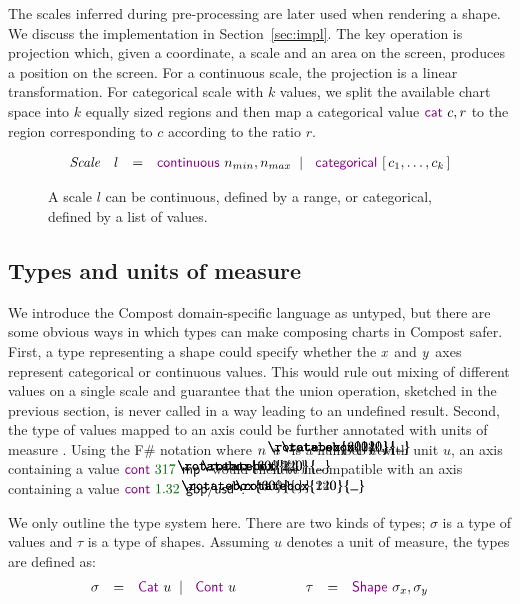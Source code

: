 \documentclass{jfp}
\newcommand{\X}{\emph{x}\ }
\newcommand{\Y}{\emph{y}\ }
\newcommand{\lsep}{\;\;|\;\;}
\newcommand{\num}[1]{\textcolor{numclr}{#1}}
\newcommand{\ident}[1]{\textnormal{\textcolor{idclr}{\sffamily #1}}}
\newcommand{\kvd}[1]{\textnormal{\textcolor{kvdclr}{\sffamily #1}}}
\newcommand{\langl}{\begin{picture}(4.5,7)
\put(1.1,2.5){\rotatebox{60}{\line(1,0){5.5}}}
\put(1.1,2.5){\rotatebox{300}{\line(1,0){5.5}}}
\end{picture}}
\newcommand{\rangl}{\begin{picture}(4.5,7)
\put(.9,2.5){\rotatebox{120}{\line(1,0){5.5}}}
\put(.9,2.5){\rotatebox{240}{\line(1,0){5.5}}}
\end{picture}}
\begin{document}
The scales inferred during pre-processing are later used when rendering a shape.
We discuss the implementation in Section~\ref{sec:impl}. The key operation is projection
which, given a coordinate, a scale and an area on the screen, produces a position on
the screen. For a continuous scale, the projection is a linear transformation. For
categorical scale with $k$ values, we split the available chart space into $k$ equally sized
regions and then map a categorical value $\kvd{cat}~c, r$ to the region corresponding to $c$
according to the ratio $r$.

\begin{figure}
\vspace{-0.5em}
\begin{equation*}
\begin{array}{rcl}
\textit{Scale}~~~l & = & \kvd{continuous}~n_{min}, n_{max} \lsep \kvd{categorical}~[\,c_1, \ldots, c_k\,]
\end{array}
\end{equation*}
\vspace{-1em}
\caption{A scale $l$ can be continuous, defined by a range, or categorical, defined by a list of values.}
\label{fig:scale}
\vspace{-1em}
\end{figure}


\subsection{Types and units of measure}
\label{sec:basic-types}

We introduce the Compost domain-specific language as untyped, but there are some obvious ways in
which types can make composing charts in Compost safer. First, a type representing a shape could
specify whether the \X and \Y axes represent categorical or continuous values. This would rule out
mixing of different values on a single scale and guarantee that the \ident{union} operation,
sketched in the previous section, is never called in a way leading to an undefined result.
Second, the type of values mapped to an axis could be further annotated with units of measure
\cite{units}. Using the F\# notation where $n\langl u\rangl$ is a number $n$ with unit $u$,
an axis containing a value $\kvd{cont}~\num{317}\langl \ident{mp}\rangl$ would then be incompatible
with an axis containing a value $\kvd{cont}~\num{1.32}\langl \ident{gbp}/\ident{usd}\rangl$.

We only outline the type system here. There are two kinds of types; $\sigma$ is a type of values
and $\tau$ is a type of shapes. Assuming $u$ denotes a unit of measure, the types are defined as:
%
\begin{equation*}
\begin{array}{rcl}
\sigma & = & \kvd{Cat}~u \lsep \kvd{Cont}~u
\end{array}
\qquad\qquad
\begin{array}{rcl}
\tau & = & \kvd{Shape}~\sigma_x, \sigma_y \\
\end{array}
\end{equation*}
\end{document}
